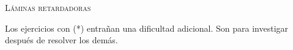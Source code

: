 \documentclass[11pt, spanish, a4paper, twoside]{article}
\begin{document}
\begin{center}
	\textsc{\LARGE Láminas retardadoras}
\end{center}

Los ejercicios con (*) entrañan una dificultad adicional. Son para investigar después de resolver los demás.


\begin{enumerate}

}



\end{enumerate}
\end{document}
